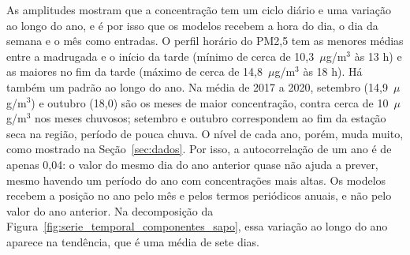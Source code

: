 \begin{table}[htbp]
    \centering
    \caption{Padrões temporais de PM2,5 e PM10 na estação Sapo, calculados com as horas medidas de 2017 a 2020.}
    \label{tab:padroes_temporais_sapo}
\end{table}

As amplitudes mostram que a concentração tem um ciclo diário e uma variação ao longo do ano, e é por isso que os modelos recebem a hora do dia, o dia da semana e o mês como entradas. O perfil horário do PM2,5 tem as menores médias entre a madrugada e o início da tarde (mínimo de cerca de 10,3~\(\mu\)g/m\(^3\) às 13 h) e as maiores no fim da tarde (máximo de cerca de 14,8~\(\mu\)g/m\(^3\) às 18 h). Há também um padrão ao longo do ano. Na média de 2017 a 2020, setembro (14,9~\(\mu\)g/m\(^3\)) e outubro (18,0) são os meses de maior concentração, contra cerca de 10~\(\mu\)g/m\(^3\) nos meses chuvosos; setembro e outubro correspondem ao fim da estação seca na região, período de pouca chuva. O nível de cada ano, porém, muda muito, como mostrado na Seção~\ref{sec:dados}. Por isso, a autocorrelação de um ano é de apenas 0,04: o valor do mesmo dia do ano anterior quase não ajuda a prever, mesmo havendo um período do ano com concentrações mais altas. Os modelos recebem a posição no ano pelo mês e pelos termos periódicos anuais, e não pelo valor do ano anterior. Na decomposição da Figura~\ref{fig:serie_temporal_componentes_sapo}, essa variação ao longo do ano aparece na tendência, que é uma média de sete dias.

